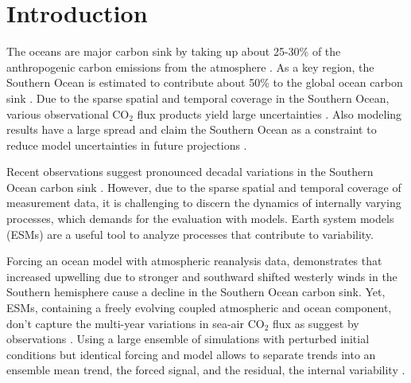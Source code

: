 %
%

%

\chapter{Introduction}\label{ch:introduction}

The oceans are major carbon sink by taking up about 25-30\% of the anthropogenic carbon emissions from the atmosphere \citep{Sabine2004,Quere2016}. As a key region, the Southern Ocean is estimated to contribute about 50\% to the global ocean carbon sink \citep{Takahashi2012}. Due to the sparse spatial and temporal coverage in the Southern Ocean, various observational CO$_2$ flux products yield large uncertainties \citep{Roedenbeck2015}. Also modeling results have a large spread \citep{Wang2016} and claim the Southern Ocean as a constraint to reduce model uncertainties in future projections \citep{Kessler2016}.\newline

Recent observations suggest pronounced decadal variations in the Southern Ocean carbon sink \citep{Roedenbeck2013,landschuetzer2015}. However, due to the sparse spatial and temporal coverage of measurement data, it is challenging to discern the dynamics of internally varying processes, which demands for the evaluation with models. Earth system models (\acs{ESM}s) are a useful tool to analyze processes that contribute to variability.

Forcing an ocean model with atmospheric reanalysis data, \cite{Lovenduski2007,Lovenduski2008} demonstrates that increased upwelling due to stronger and southward shifted westerly winds in the Southern hemisphere cause a decline in the Southern Ocean carbon sink. Yet, \acs{ESM}s, containing a freely evolving coupled atmospheric and ocean component, don't capture the multi-year variations in sea-air CO$_2$ flux as suggest by observations \citep{Wang2016}. Using a large ensemble of simulations with perturbed initial conditions but identical forcing and model allows to separate trends into an ensemble mean trend, the forced signal, and the residual, the internal variability \citep{McKinley2016,McKinley2017}.\newline

